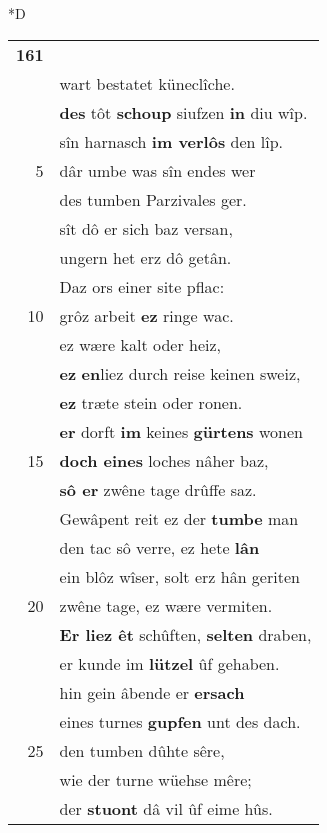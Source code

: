 \documentclass[8pt,a4paper,notitlepage]{article}
\begin{document}
\begin{table}[ht]
\begin{minipage}[t]{0.5\linewidth}
\small
\begin{center}*D
\end{center}
\begin{tabular}{rl}
\textbf{161} & \textit{\begin{large}I\end{large}}ther, der lobes rîche,\\ 
 & wart bestatet küneclîche.\\ 
 & \textbf{des} tôt \textbf{schoup} siufzen \textbf{in} diu wîp.\\ 
 & sîn harnasch \textbf{im verlôs} den lîp.\\ 
5 & dâr umbe was sîn endes wer\\ 
 & des tumben Parzivales ger.\\ 
 & sît dô er sich baz versan,\\ 
 & ungern het erz dô getân.\\ 
 & Daz ors einer site pflac:\\ 
10 & grôz arbeit \textbf{ez} ringe wac.\\ 
 & ez wære kalt oder heiz,\\ 
 & \textbf{ez} \textbf{en}liez durch reise keinen sweiz,\\ 
 & \textbf{ez} træte stein oder ronen.\\ 
 & \textbf{er} dorft \textbf{im} keines \textbf{gürtens} wonen\\ 
15 & \textbf{doch eines} loches nâher baz,\\ 
 & \textbf{sô er} zwêne tage drûffe saz.\\ 
 & Gewâpent reit ez der \textbf{tumbe} man\\ 
 & den tac sô verre, ez hete \textbf{lân}\\ 
 & ein blôz wîser, solt erz hân geriten\\ 
20 & zwêne tage, ez wære vermiten.\\ 
 & \textbf{Er liez êt} schûften, \textbf{selten} draben,\\ 
 & er kunde im \textbf{lützel} ûf gehaben.\\ 
 & hin gein âbende er \textbf{ersach}\\ 
 & eines turnes \textbf{gupfen} unt des dach.\\ 
25 & den tumben dûhte sêre,\\ 
 & wie der turne wüehse mêre;\\ 
 & der \textbf{stuont} dâ vil ûf eime hûs.\\ 

\end{tabular}
\end{minipage}
\end{table}
\end{document}
